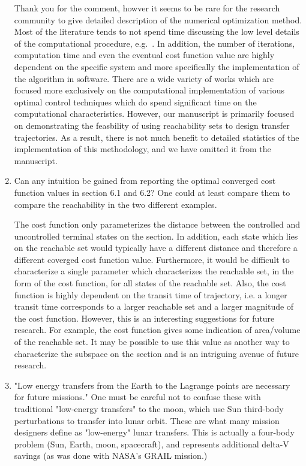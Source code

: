 \documentclass[11pt]{article}
\begin{document}
\begin{enumerate}
Thank you for the comment, howver it seems to be rare for the research community to give detailed description of the numerical optimization method.
Most of the literature tends to not spend time discussing the low level details of the computational procedure, e.g.~\cite{grebow2011,stuart2010}.
In addition, the number of iterations, computation time and even the eventual cost function value are highly dependent on the specific system and more specifically the implementation of the algorithm in software. 
There are a wide variety of works which are focused more exclusively on the computational implementation of various optimal control techniques which do spend significant time on the computational characteristics.
However, our manuscript is primarily focused on demonstrating the feasbility of using reachability sets to design transfer trajectories.
As a result, there is not much benefit to detailed statistics of the implementation of this methodology, and we have omitted it from the manuscript.

\item 
    \begin{itshape}
Can any intuition be gained from reporting the optimal converged cost function values in section 6.1 and 6.2?  One could at least compare them to compare the reachability in the two different examples.
\end{itshape}

The cost function only parameterizes the distance between the controlled and uncontrolled terminal states on the \Poincare section. 
In addition, each state which lies on the reachable set would typically have a different distance and therefore a different coverged cost function value. 
Furthermore, it would be difficult to characterize a single parameter which characterizes the reachable set, in the form of the cost function, for all states of the reachable set. 
Also, the cost function is highly dependent on the transit time of trajectory, i.e. a longer transit time corresponds to a larger reachable set and a larger magnitude of the cost function.
However, this is an interesting suggestions for future research.
For example, the cost function gives some indication of area/volume of the reachable set. 
It may be possible to use this value as another way to characterize the subspace on the \Poincare section and is an intriguing avenue of future research.

\item
    \begin{itshape}
"Low energy transfers from the Earth to the Lagrange points are necessary for future missions."  One must be careful not to confuse these with traditional "low-energy transfers" to the moon, which use Sun third-body perturbations to transfer into lunar orbit.  These are what many mission designers define as "low-energy" lunar transfers.  This is actually a four-body problem (Sun, Earth, moon, spacecraft), and represents additional delta-V savings (as was done with NASA's GRAIL mission.)


\end{itshape}
\end{enumerate}
\end{document}
